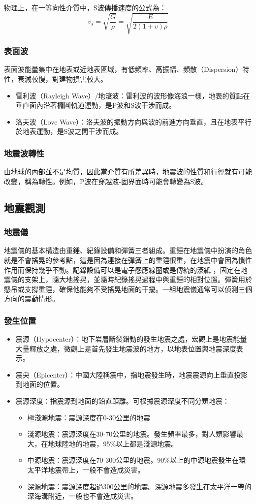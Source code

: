 \documentclass[a4paper,12pt]{report}
\begin{document}
物理上，在一等向性介質中，S波傳播速度的公式為：
$$\displaystyle v_{s}={\sqrt {\frac {G}{\rho }}}={\sqrt {\frac {E}{2(1+v)\rho }}}$$
\subsubsection{表面波}
表面波能量集中在地表或近地表區域，有低頻率、高振幅、頻散（Dispersion）特性，衰減較慢，對建物損害較大。
\begin{itemize}
\item 雷利波（Rayleigh Wave）/地滾波：雷利波的波形像海浪一樣，地表的質點在垂直面內沿著橢圓軌道運動，是P波和S波干涉而成。
\item 洛夫波（Love Wave）：洛夫波的振動方向與波的前進方向垂直，且在地表平行於地表運動，是S波之間干涉而成。
\end{itemize}
\subsubsection{地震波轉性}
由地球的內部並不是均質，因此當介質有所差異時，地震波的性質和行徑就有可能改變，稱為轉性。例如，P波在穿越液-固界面時可能會轉變為S波。
\subsection{地震觀測}
\subsubsection{地震儀}
地震儀的基本構造由重錘、紀錄設備和彈簧三者組成。重錘在地震儀中扮演的角色就是不會搖晃的參考點，這是因為連接在彈簧上的重錘很重，在地震中會因為慣性作用而保持幾乎不動。記錄設備可以是電子感應線圈或是傳統的滾紙 ，固定在地震儀的支架上，隨大地搖晃，並隨時紀錄搖晃過程中與重錘的相對位置。彈簧用於懸吊或支撐重錘，確保他能夠不受搖晃地面的干擾。一組地震儀通常可以偵測三個方向的震動情形。
\subsubsection{發生位置}
\begin{itemize}
\item 震源（Hypocenter）：地下岩層斷裂錯動的發生地震之處，宏觀上是地震能量大量釋放之處，微觀上是首先發生地震波的地方，以地表位置與地震深度表示。
\item 震央（Epicenter）：中國大陸稱震中，指地震發生時，地震震源向上垂直投影到地面的位置。
\item 震源深度：指震源到地面的鉛直距離。可根據震源深度不同分類地震：
\begin{itemize}
\item 極淺源地震：震源深度在0-30公里的地震
\item 淺源地震：震源深度在30-70公里的地震。發生頻率最多，對人類影響最大，在地球陸地的地震，95\%以上都是淺源地震。
\item 中源地震：震源深度在70-300公里的地震。90\%以上的中源地震發生在環太平洋地震帶上，一般不會造成災害。
\item 深源地震：震源深度超過300公里的地震。深源地震多發生在太平洋一帶的深海溝附近，一般也不會造成災害。
\end{itemize}
\end{itemize}
\end{document}

